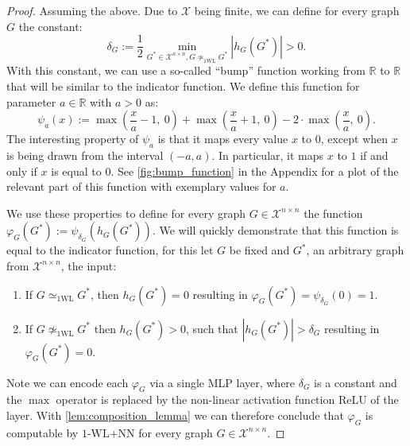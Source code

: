 \documentclass[11pt, dvipsnames, DIV=12]{scrreprt}
\theoremstyle{definition}
\newtheorem{lemma}[theorem]{Lemma}
\newcommand{\cX}{\mathcal{X}}
\newcommand{\Rb}{\mathbb{R}}
\newcommand{\wlnn}{\text{1-WL+NN}}
\newcommand{\wliso}{\simeq_{\text{1WL}}}
\newcommand{\xnn}{\mathcal{X}^{n \times n}}
\begin{document}
\begin{proof}
    Assuming the above. Due to $\cX$ being finite, we can define for every graph $G$ the constant:
    \begin{equation*}
        \delta_G := \frac{1}{2} \min_{G^* \in \xnn , G \not\wliso G^*} |h_G(G^*)| > 0.
    \end{equation*}
    With this constant, we can use a so-called ``bump'' function working from $\Rb$ to $\Rb$ that will be similar to the indicator function. We define this function for parameter $a \in \Rb$ with $a > 0$ as:
    \begin{equation*}
        \psi_a(x) := \max(\frac{x}{a} -1,\ 0) + \max(\frac{x}{a}+1, \ 0) - 2 \cdot \max(\frac{x}{a}, \ 0).
    \end{equation*}
    The interesting property of $\psi_a$ is that it maps every value $x$ to $0$, except when $x$ is being drawn from the interval $(-a, a)$. In particular, it maps $x$ to $1$ if and only if $x$ is equal to $0$. See \autoref{fig:bump_function} in the Appendix for a plot of the relevant part of this function with exemplary values for $a$.
    
    We use these properties to define for every graph $G \in \xnn$ the function $\varphi_G(G^*) := \psi_{\delta_G} (h_G(G^*))$. 
    We will quickly demonstrate that this function is equal to the indicator function, for this let $G$ be fixed and $G^*$, an arbitrary graph from $\xnn$, the input:
    \begin{enumerate}
        \item If $G \wliso G^*$, then $h_G(G^*) = 0$ resulting in $\varphi_G(G^*) = \psi_{\delta_G}(0) = 1$.
        \item If $G \not\wliso G^*$ then $h_G(G^*) > 0$, such that $|h_G(G^*)|> \delta_G$ resulting in $\varphi_G(G^*) = 0$.
    \end{enumerate}
    Note we can encode each $\varphi_G$ via a single MLP layer, where $\delta_G$ is a constant and the $\max$ operator is replaced by the non-linear activation function ReLU of the layer. With \cref{lem:composition_lemma} we can therefore conclude that $\varphi_G$ is computable by $\wlnn$ for every graph $G \in \xnn$.
\end{proof}
\end{document}
